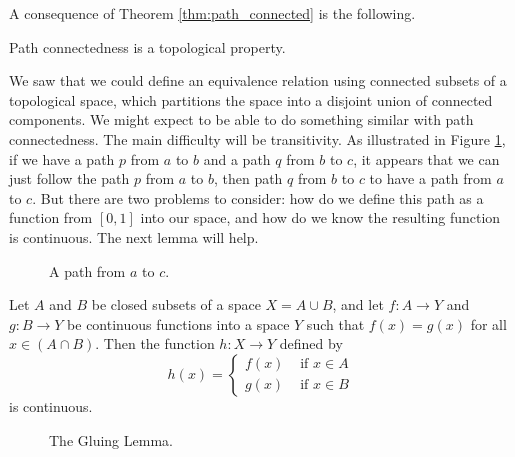 A consequence of Theorem \ref{thm:path_connected} is the following.

\begin{corollary} Path connectedness is a topological property.
\end{corollary}


\label{sec_path_connect_equiv}

We saw that we could define an equivalence relation using connected subsets of a topological space, which partitions the space into a disjoint union of connected components. We might expect to be able to do something similar with path connectedness. The main difficulty will be transitivity. As illustrated in Figure \ref{F:path_transitive}, if we have a path $p$ from $a$ to $b$ and a path $q$ from $b$ to $c$, it appears that we can just follow the path $p$ from $a$ to $b$, then path $q$ from $b$ to $c$ to have a path from $a$ to $c$. But there are two problems to consider: how do we define this path as a function from $[0,1]$ into our space, and how do we know the resulting function is continuous. The next lemma will help.
\begin{figure}[h]
\begin{center}
\end{center}
\caption{A path from $a$ to $c$.}
\label{F:path_transitive}
\end{figure}

\begin{lemma}  Let $A$ and $B$ be closed subsets of a space $X = A \cup B$, and let $f:A \to Y$ and $g: B \to Y$ be continuous functions into a space $Y$ such that $f(x)=g(x)$ for all $x \in (A \cap B)$. Then the function $h:X \to Y$ defined by 
\[h(x) = \begin{cases} f(x) &\text{ if } x \in A \\ g(x) &\text{ if } x \in B \end{cases}\]
is continuous. 
\end{lemma}

\begin{figure}[h]
\begin{center}
\end{center}
\caption{The Gluing Lemma.}
\label{F:Gluing_Lemma}
\end{figure}

